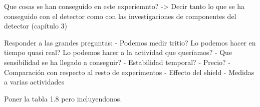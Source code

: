 Que cosas se han conseguido en este experiemnto? -> Decir tanto lo que se ha conseguido con el detector como con las investigaciones de componentes del detector (capítulo 3)

Responder a las grandes preguntas:
	- Podemos medir tritio? Lo podemos hacer en tiempo quasi real? Lo podemos hacer a la actividad que queríamos?
	- Que sensibilidad se ha llegado a conseguir?
	- Estabilidad temporal?
	- Precio?
	- Comparación con respecto al resto de experimentos
	- Effecto del shield
	- Medidas a varias actividades
	
	
Poner la tabla 1.8 pero incluyendonos.